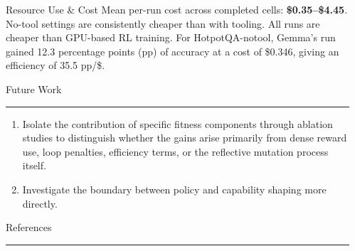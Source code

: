 \documentclass[final]{beamer}
\newcommand{\blockrule}{\vspace{-1.5em}\textcolor{harvardcrimson}{\rule{\linewidth}{1.2pt}}\vspace{-0.2em}}
\newlength{\sepwidth}
\newlength{\colwidth}
\newcommand{\separatorcolumn}{\begin{column}{\sepwidth}\end{column}}
\begin{document}
\begin{frame}[t]
\begin{columns}[t]
\begin{column}{\colwidth}
\begin{block}{Resource Use \& Cost}
    Mean per-run cost across completed cells: \textbf{\$0.35--\$4.45}. No-tool settings are consistently cheaper than with tooling. All runs are cheaper than GPU-based RL training. For HotpotQA-notool, Gemma's run gained 12.3 percentage points (pp) of accuracy at a cost of \$0.346, giving an efficiency of 35.5 pp/\$.
    \vspace{-1em}
    \begin{table}[H]
    \centering
    \label{tab:cost_efficiency_table}
    \small
    \setlength{\tabcolsep}{4pt}
    \normalsize
    \end{table}
  \end{block}
    \vspace{-1em}

    \begin{block}{Future Work}
    \blockrule
    \begin{enumerate}
        \item Isolate the contribution of specific fitness components through ablation studies to distinguish whether the gains arise primarily from dense reward use, loop penalties, efficiency terms, or the reflective mutation process itself.
        \item Investigate the boundary between policy and capability shaping more directly. 
    \end{enumerate}
    \end{block}
    
    \vspace{-1.4em}
  \begin{block}{References}
    \blockrule
    \nocite{*}
    \footnotesize{}
  \end{block}

\end{column}

\separatorcolumn
\end{columns}
\end{frame}
\end{document}
